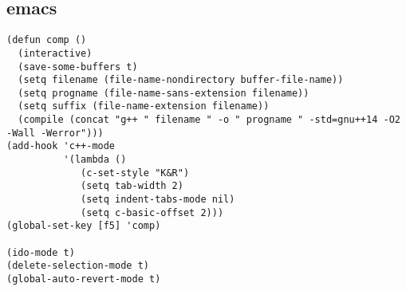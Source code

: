 \documentclass[twoside]{article}
\begin{document}
\subsection{emacs}
\begin{lstlisting}
(defun comp ()
  (interactive)
  (save-some-buffers t)
  (setq filename (file-name-nondirectory buffer-file-name))
  (setq progname (file-name-sans-extension filename))
  (setq suffix (file-name-extension filename))
  (compile (concat "g++ " filename " -o " progname " -std=gnu++14 -O2 -Wall -Werror")))
(add-hook 'c++-mode
          '(lambda ()
             (c-set-style "K&R")
             (setq tab-width 2)
             (setq indent-tabs-mode nil)
             (setq c-basic-offset 2)))
(global-set-key [f5] 'comp)

(ido-mode t)
(delete-selection-mode t)
(global-auto-revert-mode t)

\end{lstlisting}
\end{document}
